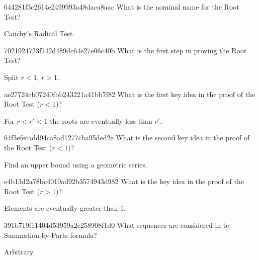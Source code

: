 \begin{note}{644281f3c2614e2499993a48daca8aac}
    What is the nominal name for the Root Test?

    \begin{cloze}{1}
        Cauchy's Radical Test.
    \end{cloze}
\end{note}

\begin{note}{7021924723f142d489dc64e27e06c40b}
    What is the first step in proving the Root Test?

    \begin{cloze}{1}
        Split \({ r < 1 }\), \({ r > 1 }\).
    \end{cloze}
\end{note}

\begin{note}{ae27724cb07240fbb243221a41bb7f82}
    What is the first key idea in the proof of the Root Test (\({ r < 1 }\))?

    \begin{cloze}{1}
        For \({ r < r' < 1 }\) the roots are eventually less than \({ r' }\).
    \end{cloze}
\end{note}

\begin{note}{64f3efecadd94ca8ad1277cba95ded2e}
    What is the second key idea in the proof of the Root Test (\({ r < 1 }\))?

    \begin{cloze}{1}
        Find an upper bound using a geometric series.
    \end{cloze}
\end{note}

\begin{note}{e4b13d2a78bc4010ad92b3574943d982}
    What is the key idea in the proof of the Root Test (\({ r > 1 }\))?

    \begin{cloze}{1}
        Elements are eventually greater than \({ 1 }\).
    \end{cloze}
\end{note}

\begin{note}{391b719f11404d53959a2e258908f1d0}
    What sequences are considered in te Summation-by-Parts formula?

    \begin{cloze}{1}
        Arbitrary.
    \end{cloze}
\end{note}

